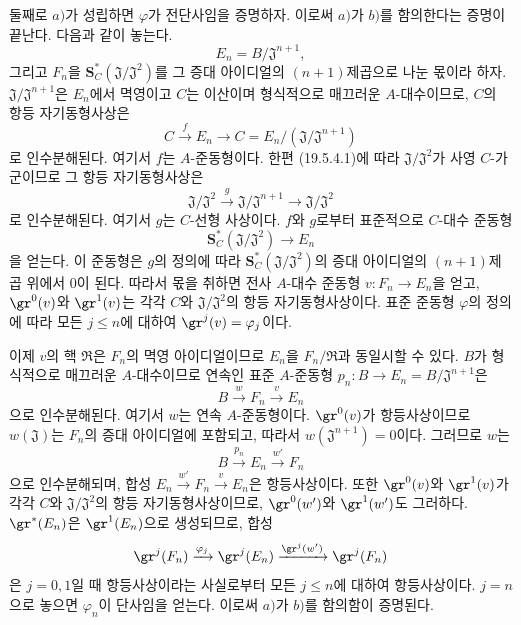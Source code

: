 \begin{env}[19.5.4.2]
\label{0.19.5.4.2-fr}
둘째로 $a)$가 성립하면 $\varphi$가 전단사임을 증명하자. 이로써
$a)$가 $b)$를 함의한다는 증명이 끝난다. 다음과 같이 놓는다.
\[
  E_n=B/\mathfrak J^{n+1},
\]
그리고 $F_n$을 $\mathbf S_C^*(\mathfrak J/\mathfrak J^2)$를 그
증대 아이디얼의 $(n+1)$제곱으로 나눈 몫이라 하자.
$\mathfrak J/\mathfrak J^{n+1}$은 $E_n$에서 멱영이고 $C$는 이산이며
형식적으로 매끄러운 $A$-대수이므로, $C$의 항등 자기동형사상은
\[
  C\xrightarrow{f}E_n\longrightarrow
  C=E_n/(\mathfrak J/\mathfrak J^{n+1})
\]
로 인수분해된다. 여기서 $f$는 $A$-준동형이다. 한편 (19.5.4.1)에
따라 $\mathfrak J/\mathfrak J^2$가 사영 $C$-가군이므로 그 항등
자기동형사상은
\[
  \mathfrak J/\mathfrak J^2\xrightarrow{g}
  \mathfrak J/\mathfrak J^{n+1}
  \longrightarrow\mathfrak J/\mathfrak J^2
\]
로 인수분해된다. 여기서 $g$는 $C$-선형 사상이다. $f$와 $g$로부터
표준적으로 $C$-대수 준동형
\[
  \mathbf S_C^*(\mathfrak J/\mathfrak J^2)\longrightarrow E_n
\]
을 얻는다. 이 준동형은 $g$의 정의에 따라
$\mathbf S_C^*(\mathfrak J/\mathfrak J^2)$의 증대 아이디얼의
$(n+1)$제곱 위에서 0이 된다. 따라서 몫을 취하면 전사 $A$-대수
준동형 $v:F_n\to E_n$을 얻고,
$\gr^0(v)$와 $\gr^1(v)$는 각각 $C$와
$\mathfrak J/\mathfrak J^2$의 항등 자기동형사상이다. 표준 준동형
$\varphi$의 정의에 따라 모든 $j\leq n$에 대하여
$\gr^j(v)=\varphi_j$이다.

이제 $v$의 핵 $\mathfrak R$은 $F_n$의 멱영 아이디얼이므로
$E_n$을 $F_n/\mathfrak R$과 동일시할 수 있다. $B$가 형식적으로
매끄러운 $A$-대수이므로 연속인 표준 $A$-준동형
$p_n:B\to E_n=B/\mathfrak J^{n+1}$은
\[
  B\xrightarrow{w}F_n\xrightarrow{v}E_n
\]
으로 인수분해된다. 여기서 $w$는 연속 $A$-준동형이다.
$\gr^0(v)$가 항등사상이므로 $w(\mathfrak J)$는 $F_n$의 증대
아이디얼에 포함되고, 따라서 $w(\mathfrak J^{n+1})=0$이다. 그러므로
$w$는
\[
  B\xrightarrow{p_n}E_n\xrightarrow{w'}F_n
\]
으로 인수분해되며, 합성
$E_n\xrightarrow{w'}F_n\xrightarrow{v}E_n$은 항등사상이다. 또한
$\gr^0(v)$와 $\gr^1(v)$가 각각 $C$와
$\mathfrak J/\mathfrak J^2$의 항등 자기동형사상이므로,
$\gr^0(w')$와 $\gr^1(w')$도 그러하다. $\gr^*(E_n)$은
$\gr^1(E_n)$으로 생성되므로, 합성
\[
  \gr^j(F_n)\xrightarrow{\varphi_j}\gr^j(E_n)
  \xrightarrow{\gr^j(w')}\gr^j(F_n)
\]
은 $j=0,1$일 때 항등사상이라는 사실로부터 모든 $j\leq n$에
대하여 항등사상이다. $j=n$으로 놓으면 $\varphi_n$이 단사임을
얻는다. 이로써 $a)$가 $b)$를 함의함이 증명된다.
\end{env}

